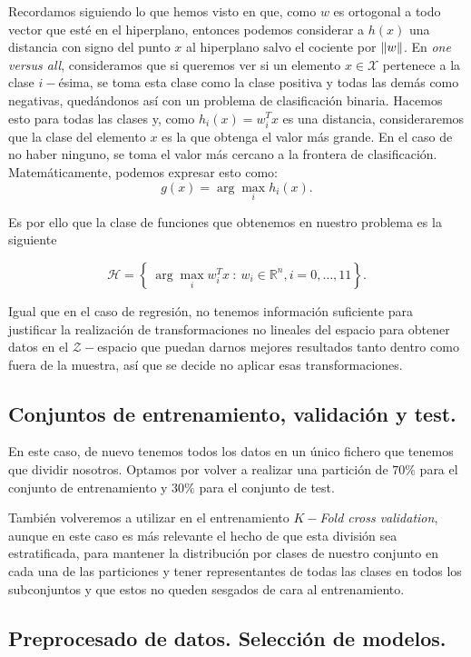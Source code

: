 \documentclass[a4paper, 20pt]{article}
\newcommand{\R}{\mathbb R}
\begin{document}
Recordamos siguiendo lo que hemos visto en \cite{learn_from_data} que, como $w$ es ortogonal a todo vector que esté en el hiperplano, entonces podemos considerar a $h(x)$ una distancia con signo del punto $x$ al hiperplano salvo el cociente por $\norm{w}$. En \emph{one versus all}, consideramos que si queremos ver si un elemento $x \in \mathcal X$ pertenece a la clase $i-$ésima, se toma esta clase como la clase positiva y todas las demás como negativas, quedándonos así con un problema de clasificación binaria. Hacemos esto para todas las clases y, como $h_i(x) = w_i^T x$ es una distancia, consideraremos que la clase del elemento $x$ es la que obtenga el valor más grande. En el caso de no haber ninguno, se toma el valor más cercano a la frontera de clasificación. Matemáticamente, podemos expresar esto como:
$$
g(x) = \arg \max_i h_i(x).
$$

Es por ello que la clase de funciones que obtenemos en nuestro problema es la siguiente

$$
\mathcal H = \left\{ \ \arg \max_i w_i^T x  \ : \ w_i \in \R^n, i = 0,\dots,11\right\}.
$$

Igual que en el caso de regresión, no tenemos información suficiente para justificar la realización de transformaciones no lineales del espacio para obtener datos en el $\mathcal Z-$espacio que puedan darnos mejores resultados tanto dentro como fuera de la muestra, así que se decide no aplicar esas transformaciones.

\subsection{Conjuntos de entrenamiento, validación y test.}

En este caso, de nuevo tenemos todos los datos en un único fichero que tenemos que dividir nosotros. Optamos por volver a realizar una partición de $70\%$ para el conjunto de entrenamiento y $30\%$ para el conjunto de test.

También volveremos a utilizar en el entrenamiento $K-$\emph{Fold cross validation}, aunque en este caso es más relevante el hecho de que esta división sea estratificada, para mantener la distribución por clases de nuestro conjunto en cada una de las particiones y tener representantes de todas las clases en todos los subconjuntos y que estos no queden sesgados de cara al entrenamiento.

\subsection{Preprocesado de datos. Selección de modelos.}
\end{document}
